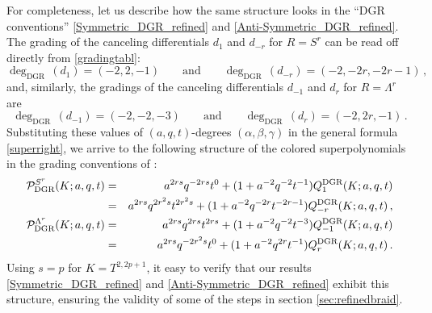 \documentclass[hyper,letterpaper]{JHEP3}
\newcommand{\be}{\begin{equation}}
\newcommand{\ee}{\end{equation}}
\renewcommand{\P}{{\cal P}}
\begin{document}
For completeness, let us describe how the same structure looks in the ``DGR conventions''
\eqref{Symmetric_DGR_refined} and \eqref{Anti-Symmetric_DGR_refined}.
The grading of the canceling differentials $d_1$ and $d_{-r}$ for $R = S^r$
can be read off directly from \eqref{gradingtabl}:
\be
\deg_{\text{DGR}} \, (d_1) = (-2,2,-1) \qquad \text{and} \qquad \deg_{\text{DGR}} \, (d_{-r}) = (-2,-2r,-2r-1) \,,
\ee
and, similarly, the gradings of the canceling differentials $d_{-1}$ and $d_{r}$ for $R = \Lambda^r$ are
\be
\deg_{\text{DGR}} \, (d_{-1}) = (-2,-2,-3) \qquad \text{and} \qquad \deg_{\text{DGR}} \, (d_{r}) = (-2,2r,-1) \,.
\ee
Substituting these values of $(a,q,t)$-degrees $(\alpha, \beta, \gamma)$ in the general formula \eqref{superright},
we arrive to the following structure of the colored superpolynomials in the grading conventions of \cite{DGR}:
\begin{eqnarray}
\P^{S^r}_{\text{DGR}} (K; a,q,t)
&=&a^{2rs}q^{-2rs}t^{0} + (1+a^{-2}q^{-2}t^{-1})Q_1^{\text{DGR}}(K;a,q,t)
\nonumber \\
&=&a^{2rs}q^{2r^2 s} t^{2r^2 s} + (1+a^{-2}q^{-2r}t^{-2r-1})Q_{-r}^{\text{DGR}}(K;a,q,t) \,,
\\
\P^{\Lambda^r}_{\text{DGR}} (K; a,q,t)
&=&a^{2rs} q^{2rs} t^{2rs} + (1+a^{-2}q^{-2}t^{-3})Q_{-1}^{\text{DGR}}(K;a,q,t)
\nonumber \\
&=&a^{2rs} q^{-2r^2 s} t^0 + (1+a^{-2}q^{2r}t^{-1})Q_{r}^{\text{DGR}}(K;a,q,t) \,.
\end{eqnarray}
Using $s=p$ for $K=T^{2,2p+1}$, it easy to verify that our results
\eqref{Symmetric_DGR_refined} and \eqref{Anti-Symmetric_DGR_refined}
exhibit this structure, ensuring the validity of some of the steps in section \ref{sec:refinedbraid}.\\
\end{document}
